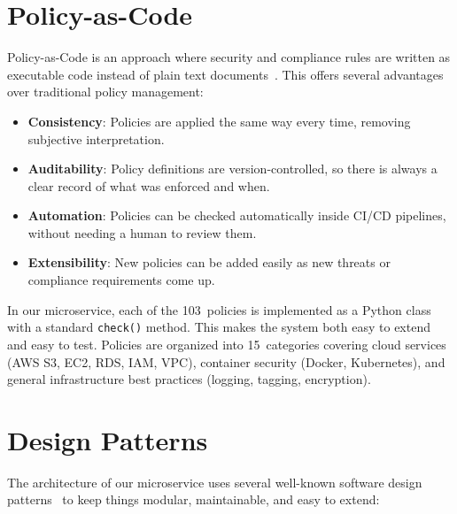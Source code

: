 \section{Policy-as-Code}
\label{sec:policy-as-code}

Policy-as-Code is an approach where security and compliance rules are written as executable code instead of plain text documents~\cite{openpolicyagent2024}. This offers several advantages over traditional policy management:

\begin{itemize}[leftmargin=1.5cm]
  \item \textbf{Consistency}: Policies are applied the same way every time, removing subjective interpretation.
  \item \textbf{Auditability}: Policy definitions are version-controlled, so there is always a clear record of what was enforced and when.
  \item \textbf{Automation}: Policies can be checked automatically inside CI/CD pipelines, without needing a human to review them.
  \item \textbf{Extensibility}: New policies can be added easily as new threats or compliance requirements come up.
\end{itemize}

In our microservice, each of the 103~policies is implemented as a Python class with a standard \texttt{check()} method. This makes the system both easy to extend and easy to test. Policies are organized into 15~categories covering cloud services (AWS S3, EC2, RDS, IAM, VPC), container security (Docker, Kubernetes), and general infrastructure best practices (logging, tagging, encryption).


\section{Design Patterns}
\label{sec:patterns}

The architecture of our microservice uses several well-known software design patterns~\cite{gamma1994patterns, martin2017cleanarch} to keep things modular, maintainable, and easy to extend:

